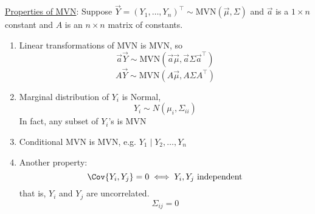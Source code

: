 \underline{Properties of MVN}:
Suppose $ \vec{Y}=(Y_1,\ldots,Y_n)^\top \sim \text{MVN}(\vec{\mu},\Sigma) $
and $ \vec{a} $ is a $ 1\times n $ constant
and $ A $ is an $ n\times n  $ matrix of constants.
\begin{enumerate}
    \item Linear transformations of MVN is MVN, so
          \[ \vec{a}\vec{Y}\sim \text{MVN}(\vec{a}\vec{\mu},\vec{a}
              \Sigma\vec{a}^\top) \]
          \[ A\vec{Y} \sim \text{MVN}(A\vec{\mu},A\Sigma A^\top) \]
    \item Marginal distribution of $ Y_i $ is
          Normal,
          \[ Y_i \sim N(\mu_i,\Sigma_{ii}) \]
          In fact, any subset of $ Y_i $'s is MVN
    \item Conditional MVN is MVN, e.g. $ Y_1\mid Y_2,\ldots,Y_n $
    \item Another property:
          \[ \Cov{Y_i,Y_j}=0\iff Y_i,Y_j\text{ independent} \]
          that is, $ Y_i $ and $ Y_j $ are uncorrelated.
          \[ \Sigma_{ij}=0 \]

\end{enumerate}
